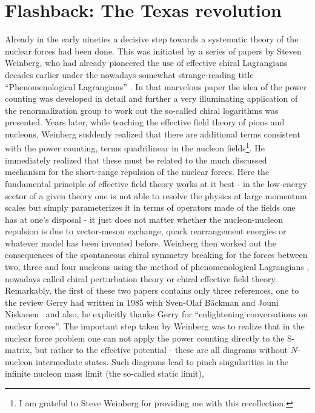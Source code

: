 \documentclass[a4paper,fleqn]{scrartcl}
\begin{document}
{\section{Flashback: The Texas revolution}

Already in the early nineties a decisive step towards a systematic
theory of the nuclear forces had been done. This was initiated by a 
series of papers by Steven Weinberg, who had already pioneered the 
use of effective chiral Lagrangians decades earlier under the nowadays
somewhat strange-reading title ``Phenomenological Lagrangians''
\cite{Weinberg:1978kz}. In that marvelous paper the idea of the
power counting was developed in detail and further a very illuminating
application of the renormalization group to work out the so-called chiral logarithms
was presented. Years later, while teaching the effective field theory of pions and
nucleons, Weinberg suddenly realized that there are additional terms consistent
with the power counting, terms quadrilinear in the nucleon fields\footnote{I
  am grateful to Steve Weinberg for providing me with this recollection.}. He
immediately realized that these must be related to the much discussed 
mechanism for the short-range repulsion of the nuclear forces. Here the
fundamental principle of effective field theory works at it best - in the
low-energy sector of a given theory one is not able to resolve the physics
at large momentum scales but simply parameterizes it in terms of operators made
of the fields one has at one's disposal - it just does not matter whether
the nucleon-nucleon repulsion is due to vector-meson exchange, quark
rearrangement energies or whatever model has been invented before.
Weinberg then 
worked out the consequences of the spontaneous chiral symmetry breaking 
for the forces between two, three and four nucleons using the method
of phenomenological Lagrangians \cite{Weinberg:1990rz}, nowadays called 
chiral perturbation theory or chiral effective field theory. Remarkably, 
the first of these
two papers contains only three references, one to the review Gerry
had written in 1985 with Sven-Olaf B\"ackman and Jouni 
Niskanen~\cite{Backman:1984sx} and also, he explicitly thanks Gerry
for  ``enlightening conversations on nuclear forces''. The 
important step taken by Weinberg was to realize that in the nuclear
force problem one can not apply the power counting directly to the
S-matrix, but rather to the effective potential - these are all diagrams
without $N$-nucleon intermediate states. Such diagrams lead to pinch 
singularities in the infinite nucleon mass limit (the so-called static limit), 
}
\end{document}
